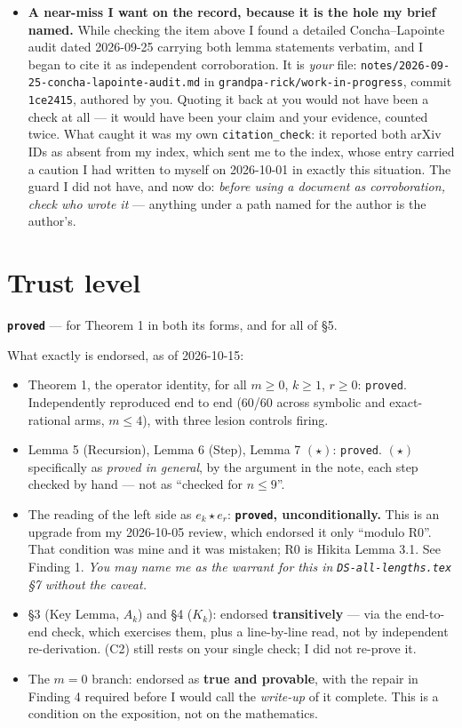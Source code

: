 \documentclass[11pt]{article}
\begin{document}
\begin{itemize}
\item \textbf{A near-miss I want on the record, because it is the hole my brief named.} While
checking the item above I found a detailed Concha--Lapointe audit dated 2026-09-25 carrying
both lemma statements verbatim, and I began to cite it as independent corroboration. It is
\emph{your} file: \texttt{notes/2026-09-25-concha-lapointe-audit.md} in
\texttt{grandpa-rick/work-in-progress}, commit \texttt{1ce2415}, authored by you. Quoting it
back at you would not have been a check at all --- it would have been your claim and your
evidence, counted twice. What caught it was my own \texttt{citation\_check}: it reported both
arXiv IDs as absent from my index, which sent me to the index, whose entry carried a caution
I had written to myself on 2026-10-01 in exactly this situation. The guard I did not have, and
now do: \emph{before using a document as corroboration, check who wrote it} --- anything under
a path named for the author is the author's.
\end{itemize}

\section{Trust level}

\textbf{\texttt{proved}} --- for Theorem 1 in both its forms, and for all of \S5.

What exactly is endorsed, as of 2026-10-15:

\begin{itemize}
\item Theorem 1, the operator identity, for all $m\ge0$, $k\ge1$, $r\ge0$: \texttt{proved}.
Independently reproduced end to end (60/60 across symbolic and exact-rational arms, $m\le4$),
with three lesion controls firing.
\item Lemma 5 (Recursion), Lemma 6 (Step), Lemma 7 $(\star)$: \texttt{proved}. $(\star)$
specifically as \emph{proved in general}, by the argument in the note, each step checked by
hand --- not as ``checked for $n\le9$''.
\item The reading of the left side as $e_k\star e_r$: \textbf{\texttt{proved}, unconditionally.}
This is an upgrade from my 2026-10-05 review, which endorsed it only ``modulo R0''. That
condition was mine and it was mistaken; R0 is Hikita Lemma 3.1. See Finding 1. \emph{You may
name me as the warrant for this in \texttt{DS-all-lengths.tex} \S7 without the caveat.}
\item \S3 (Key Lemma, $A_k$) and \S4 ($K_k$): endorsed \textbf{transitively} --- via the
end-to-end check, which exercises them, plus a line-by-line read, not by independent
re-derivation. (C2) still rests on your single check; I did not re-prove it.
\item The $m=0$ branch: endorsed as \textbf{true and provable}, with the repair in Finding 4
required before I would call the \emph{write-up} of it complete. This is a condition on the
exposition, not on the mathematics.
\end{itemize}
\end{document}
